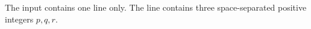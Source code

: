 The input contains one line only.
The line contains three space-separated positive integers $p,q,r$.

